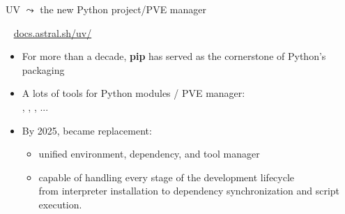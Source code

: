 \documentclass[11pt, serif, mathserif, compress]{beamer}  %
\begin{document}
\begin{frame}{UV $\leadsto$ the new Python project/PVE manager}
  
  \begin {bclogo}[noborder=true, couleur=gray!20, couleurBarre=Chocolate, logo=\raisebox{1mm}{\,\huge😀}, marge=0, margeG=-0.5, margeD=-0.5,]
    {\  \hfill \href{https://docs.astral.sh/uv/}{docs.astral.sh/uv/}}
    \smallskip
    \begin{itemize}\setlength\itemsep{3mm}
    \item<2-> For more than a decade, {\bf pip} has served as the cornerstone of Python’s packaging 
      
    \item<3-> A lots of tools for Python modules / PVE manager: \\
      , , , ... 

    \item<4-> By 2025,  became  replacement:

      \begin{itemize}
      \item unified environment, dependency, and tool manager
      \item capable of handling every stage of the development lifecycle \\
        from interpreter installation to dependency synchronization and script execution.
      \end{itemize}
      
    \end{itemize}

  \end{bclogo}
      
\end{frame}
\end{document}
